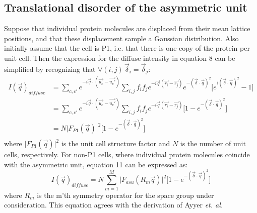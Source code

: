 \documentclass{article}
\begin{document}
\subsection{Translational disorder of the asymmetric unit} Suppose that individual protein molecules are displaced from their mean lattice positions, and that these displacement sample a Gaussian distribution. Also initially assume that the cell is P1, i.e. that there is one copy of the protein per unit cell. Then the expression for the diffuse intensity in equation 8 can be simplified by recognizing that $\forall(i,j) \, \vec{\delta}_i = \vec{\delta}_j$:
\begin{equation}
\begin{aligned}
I(\vec{q})_{diffuse} & = \sum\limits_{c,c'} e^{-i \vec{q} \cdot (\vec{u_c} - \vec{u_c'})} \sum\limits_{i,j} f_i f_j e^{-i \vec{q} (\vec{r_i} - \vec{r_j})} e^{-(\vec{\delta} \cdot \vec{q})^2} \lbrack e^{\langle ( \vec{\delta} \cdot \vec{q} )^2 } - 1 \rbrack \\
& = \sum\limits_{c,c'} e^{-i \vec{q} \cdot (\vec{u_c} - \vec{u_c'})} \sum\limits_{i,j} f_i f_j e^{-i \vec{q} (\vec{r_i} - \vec{r_j})} \lbrack 1 - e^{ - ( \vec{\delta} \cdot \vec{q} )^2 } \rbrack \\
& = N \vert F_{P1}(\vec{q}) \vert ^2 \lbrack 1 - e^{ - ( \vec{\delta} \cdot \vec{q} )^2 } \rbrack \\
\end{aligned}
\end{equation}
where $\vert F_{P1}(\vec{q}) \vert ^2$ is the unit cell structure factor and $N$ is the number of unit cells, respectively. For non-P1 cells, where individual protein molecules coincide with the asymmetric unit, equation 11 can be expressed as:
\begin{equation}
I(\vec{q})_{diffuse} = N \sum\limits_{m=1}^M \vert F_{asu}(R_m\vec{q}) \vert ^2 \lbrack 1 - e^{ - ( \vec{\delta} \cdot \vec{q} )^2 } \rbrack
\end{equation}
where $R_m$ is the m'th symmetry operator for the space group under consideration. This equation agrees with the derivation of Ayyer \textit{et. al.} \cite{pmid26863980}
\end{document}

